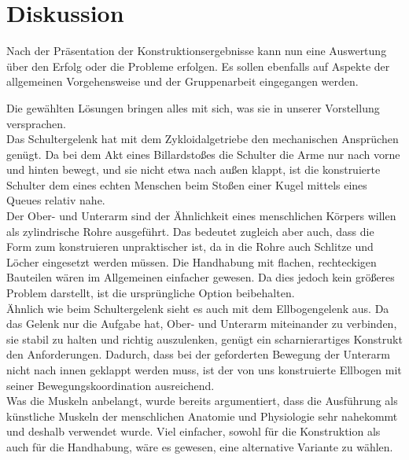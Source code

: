 \chapter{Diskussion}
	Nach der Präsentation der Konstruktionsergebnisse kann nun eine Auswertung über den Erfolg oder die Probleme erfolgen.
	Es sollen ebenfalls auf Aspekte der allgemeinen Vorgehensweise und der Gruppenarbeit eingegangen werden.\par \medskip
	Die gewählten Lösungen bringen alles mit sich, was sie in unserer Vorstellung versprachen.\\
	Das Schultergelenk hat mit dem Zykloidalgetriebe den mechanischen Ansprüchen genügt.
	Da bei dem Akt eines Billardstoßes die Schulter die Arme nur nach vorne und hinten bewegt, und sie nicht etwa nach außen klappt, ist die konstruierte Schulter dem eines echten Menschen beim Stoßen einer Kugel mittels eines Queues relativ nahe.\\
	Der Ober- und Unterarm sind der Ähnlichkeit eines menschlichen Körpers willen als zylindrische Rohre ausgeführt.
	Das bedeutet zugleich aber auch, dass die Form zum konstruieren unpraktischer ist, da in die Rohre auch Schlitze und Löcher eingesetzt werden müssen.
	Die Handhabung mit flachen, rechteckigen Bauteilen wären im Allgemeinen einfacher gewesen.
	Da dies jedoch kein größeres Problem darstellt, ist die ursprüngliche Option beibehalten.\\
	Ähnlich wie beim Schultergelenk sieht es auch mit dem Ellbogengelenk aus.
	Da das Gelenk nur die Aufgabe hat, Ober- und Unterarm miteinander zu verbinden, sie stabil zu halten und richtig auszulenken, genügt ein scharnierartiges Konstrukt den Anforderungen.
	Dadurch, dass bei der geforderten Bewegung der Unterarm nicht nach innen geklappt werden muss, ist der von uns konstruierte Ellbogen mit seiner Bewegungskoordination ausreichend.\\
	Was die Muskeln anbelangt, wurde bereits argumentiert, dass die Ausführung als künstliche Muskeln der menschlichen Anatomie und Physiologie sehr nahekommt und deshalb verwendet wurde.
	Viel einfacher, sowohl für die Konstruktion als auch für die Handhabung, wäre es gewesen, eine alternative Variante zu wählen.
